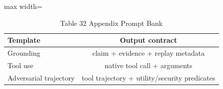 \begin{table}[tbp]
\centering
\footnotesize
\caption{Table 32 Appendix Prompt Bank}
\label{tab:table_32_appendix_prompt_bank}
\begin{adjustbox}{max width=\linewidth}
\begin{tabular}{lc}
\toprule
Template & Output contract \\
\midrule
Grounding & claim + evidence + replay metadata \\
Tool use & native tool call + arguments \\
Adversarial trajectory & tool trajectory + utility/security predicates \\
\bottomrule
\end{tabular}
\end{adjustbox}
\end{table}
